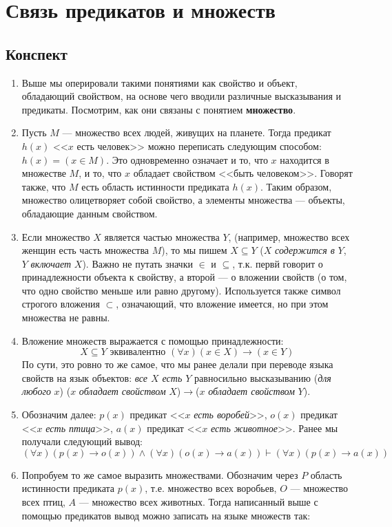 \section{Связь предикатов и множеств}

\subsection{Конспект}
\begin{enumerate}
\item Выше мы оперировали такими понятиями как свойство и объект, обладающий свойством, на основе чего вводили различные высказывания и предикаты. Посмотрим, как они связаны с понятием \textbf{множество}.
\item Пусть $M$ --- множество всех людей, живущих на планете. Тогда предикат $h(x)$ <<$x$ есть человек>> можно переписать следующим способом: $h(x)=(x\in M)$. Это одновременно означает и то, что $x$ находится в множестве $M$, и то, что $x$ обладает свойством <<быть человеком>>. Говорят также, что $M$ есть область истинности предиката $h(x)$. Таким образом, множество олицетворяет собой свойство, а элементы множества --- объекты, обладающие данным свойством.
\item Если множество $X$ является частью множества $Y$, (например, множество всех женщин есть часть множества $M$), то мы пишем $X\subseteq Y$ ($X$ \textit{содержится в} $Y$, $Y$ \textit{включает} $X$). Важно не путать значки $\in$ и $\subseteq$, т.к. первй говорит о принадлежности объекта к свойству, а второй --- о вложении свойств (о том, что одно свойство меньше или равно другому). Используется также символ строгого вложения $\subset$, означающий, что вложение имеется, но при этом множества не равны.
\item Вложение множеств выражается с помощью принадлежности:
$$
X\subseteq Y\mbox{ эквивалентно }(\forall x) (x\in X)\to(x\in Y)
$$
По сути, это ровно то же самое, что мы ранее делали при переводе языка свойств на язык объектов: \textit{все $X$ есть $Y$} равносильно высказыванию (\textit{для любого} $x$) ($x$ \textit{обладает свойством} $X$)$\to$($x$ \textit{обладает свойством} $Y$).
\item Обозначим далее: $p(x)$ предикат <<$x$ \textit{есть воробей}>>, $o(x)$ предикат <<$x$ \textit{есть птица}>>, $a(x)$ предикат <<$x$ \textit{есть животное}>>. Ранее мы получали следующий вывод:
$$
(\forall x) (p(x)\to o(x))\land (\forall x) (o(x)\to a(x))\vdash(\forall x) (p(x)\to a(x))
$$
\item Попробуем то же самое выразить множествами. Обозначим через $P$ область истинности предиката $p(x)$, т.е. множество всех воробьев, $O$ --- множество всех птиц, $A$ --- множество всех животных. Тогда написанный выше с помощью предикатов вывод можно записать на языке множеств так:

\end{enumerate}
